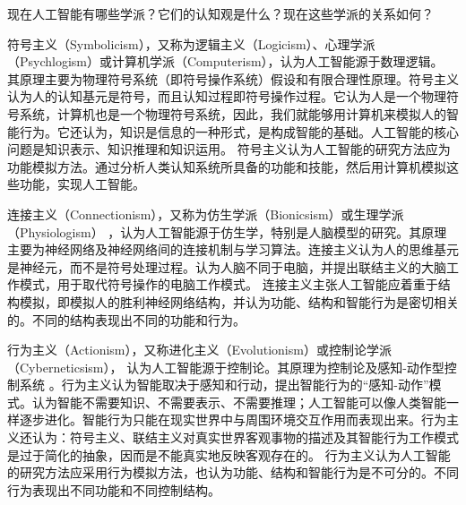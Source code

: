 \begin{question}
现在人工智能有哪些学派？它们的认知观是什么？现在这些学派的关系如何？
\end{question}
\begin{solution}
符号主义（Symbolicism），又称为逻辑主义（Logicism）、心理学派（Psychlogism）或计算机学派（Computerism），认为人工智能源于数理逻辑。 其原理主要为物理符号系统（即符号操作系统）假设和有限合理性原理。符号主义认为人的认知基元是符号，而且认知过程即符号操作过程。它认为人是一个物理符号系统，计算机也是一个物理符号系统，因此，我们就能够用计算机来模拟人的智能行为。它还认为，知识是信息的一种形式，是构成智能的基础。人工智能的核心问题是知识表示、知识推理和知识运用。 符号主义认为人工智能的研究方法应为功能模拟方法。通过分析人类认知系统所具备的功能和技能，然后用计算机模拟这些功能，实现人工智能。\par
连接主义（Connectionism），又称为仿生学派（Bionicsism）或生理学派（Physiologism） ，认为人工智能源于仿生学，特别是人脑模型的研究。其原理主要为神经网络及神经网络间的连接机制与学习算法。连接主义认为人的思维基元是神经元，而不是符号处理过程。认为人脑不同于电脑，并提出联结主义的大脑工作模式，用于取代符号操作的电脑工作模式。 连接主义主张人工智能应着重于结构模拟，即模拟人的胜利神经网络结构，并认为功能、结构和智能行为是密切相关的。不同的结构表现出不同的功能和行为。\par
行为主义（Actionism），又称进化主义（Evolutionism）或控制论学派（Cyberneticsism）， 认为人工智能源于控制论。其原理为控制论及感知-动作型控制系统 。行为主义认为智能取决于感知和行动，提出智能行为的“感知-动作”模式。认为智能不需要知识、不需要表示、不需要推理；人工智能可以像人类智能一样逐步进化。智能行为只能在现实世界中与周围环境交互作用而表现出来。行为主义还认为：符号主义、联结主义对真实世界客观事物的描述及其智能行为工作模式是过于简化的抽象，因而是不能真实地反映客观存在的。 行为主义认为人工智能的研究方法应采用行为模拟方法，也认为功能、结构和智能行为是不可分的。不同行为表现出不同功能和不同控制结构。
\end{solution}

